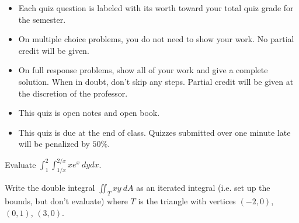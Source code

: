 \documentclass[12pt]{exam}
\newcommand{\<}{(}
\renewcommand{\>}{)}
\begin{document}
\begin{center}
\end{center}
\vspace{0.1in}

\vspace{12pt}

\begin{itemize}
  \item Each quiz question is labeled with its worth toward your total quiz
        grade for the semester.
  \item On multiple choice problems, you do not need to show your work. No
        partial credit will be given.
  \item On full response problems, show all of your work and give a
        complete solution. When in doubt, don't skip any steps. Partial
        credit will be given at the discretion of the professor.
  \item This quiz is open notes and open book.
  \item This quiz is due at the end of class. Quizzes submitted over one minute
        late will be penalized by \(50\%\).
\end{itemize}

\newpage

\begin{questions}

\question[10]
Evaluate \(\int_{1}^{2}\int_{1/x}^{2/x} xe^x ~dydx\).


\vfill
\question[10]
Write the double integral \(\iint_T xy~dA\) as an iterated integral
(i.e. set up the bounds, but don't evaluate)
where \(T\) is the triangle with vertices \((-2,0)\), \((0,1)\), \((3,0)\).

\vfill
\end{questions}
\end{document}
